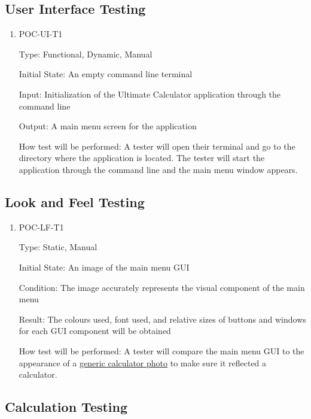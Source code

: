 \documentclass[12pt, titlepage]{article}
\begin{document}
\subsection{User Interface Testing}


\begin{enumerate}

\item{POC-UI-T1\\}

Type: Functional, Dynamic, Manual
					
Initial State: An empty command line terminal
					
Input: Initialization of the Ultimate Calculator application through the command line
					
Output: A main menu screen for the application
					
How test will be performed: A tester will open their terminal and go to the directory where the application is located. The tester will start the application through the command line and the main menu window appears.

\end{enumerate}

\subsection{Look and Feel Testing}


\begin{enumerate}

\item{POC-LF-T1\\}

Type: Static, Manual
					
Initial State: An image of the main menu GUI
					
Condition: The image accurately represents the visual component of the main menu
					
Result: The colours used, font used, and relative sizes of buttons and windows for each GUI component will be obtained
					
How test will be performed: A tester will compare the main menu GUI to the appearance of a \hyperref[calc]{generic calculator photo} to make sure it reflected a calculator.

\end{enumerate}

\subsection{Calculation Testing}
\end{document}
